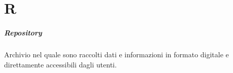 \chapter{R}

\paragraph*{Repository}
Archivio nel quale sono raccolti dati e informazioni in formato digitale e direttamente accessibili dagli utenti.